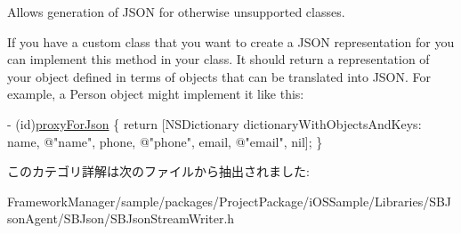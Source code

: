 Allows generation of J\+S\+O\+N for otherwise unsupported classes. 

If you have a custom class that you want to create a J\+S\+O\+N representation for you can implement this method in your class. It should return a representation of your object defined in terms of objects that can be translated into J\+S\+O\+N. For example, a Person object might implement it like this\+:


\begin{DoxyCode}
- (id)\hyperlink{category_n_s_object_07_s_b_proxy_for_json_08_aec56625fa41d8b6e7112e63dc298f92f}{proxyForJson} \{
   \textcolor{keywordflow}{return} [NSDictionary dictionaryWithObjectsAndKeys:
   name, \textcolor{stringliteral}{@"name"},
   phone, \textcolor{stringliteral}{@"phone"},
   email, \textcolor{stringliteral}{@"email"},
   nil];
\}
\end{DoxyCode}
 

このカテゴリ詳解は次のファイルから抽出されました\+:\begin{DoxyCompactItemize}
\item 
Framework\+Manager/sample/packages/\+Project\+Package/i\+O\+S\+Sample/\+Libraries/\+S\+B\+Json\+Agent/\+S\+B\+Json/S\+B\+Json\+Stream\+Writer.\+h\end{DoxyCompactItemize}
